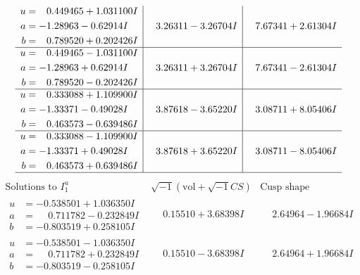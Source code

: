 \documentclass[1p]{elsarticle_modified}
\theoremstyle{definition}
\newcommand{\I}{\sqrt{-1}}
\begin{document}
$$\begin{array}{c|c|c}
\begin{aligned}
u &= \phantom{-}0.449465 + 1.031100 I \\
a &= -1.28963 - 0.62914 I \\
b &= \phantom{-}0.789520 + 0.202426 I\end{aligned}
 & \phantom{-}3.26311 - 3.26704 I & \phantom{-}7.67341 + 2.61304 I \\ \hline\begin{aligned}
u &= \phantom{-}0.449465 - 1.031100 I \\
a &= -1.28963 + 0.62914 I \\
b &= \phantom{-}0.789520 - 0.202426 I\end{aligned}
 & \phantom{-}3.26311 + 3.26704 I & \phantom{-}7.67341 - 2.61304 I \\ \hline\begin{aligned}
u &= \phantom{-}0.333088 + 1.109900 I \\
a &= -1.33371 - 0.49028 I \\
b &= \phantom{-}0.463573 - 0.639486 I\end{aligned}
 & \phantom{-}3.87618 - 3.65220 I & \phantom{-}3.08711 + 8.05406 I \\ \hline\begin{aligned}
u &= \phantom{-}0.333088 - 1.109900 I \\
a &= -1.33371 + 0.49028 I \\
b &= \phantom{-}0.463573 + 0.639486 I\end{aligned}
 & \phantom{-}3.87618 + 3.65220 I & \phantom{-}3.08711 - 8.05406 I\\
 \hline 
 \end{array}$$\newpage$$\begin{array}{c|c|c}  
\text{Solutions to }I^u_{1}& \I (\text{vol} + \sqrt{-1}CS) & \text{Cusp shape}\\
 \hline 
\begin{aligned}
u &= -0.538501 + 1.036350 I \\
a &= \phantom{-}0.711782 - 0.232849 I \\
b &= -0.803519 + 0.258105 I\end{aligned}
 & \phantom{-}0.15510 + 3.68398 I & \phantom{-}2.64964 - 1.96684 I \\ \hline\begin{aligned}
u &= -0.538501 - 1.036350 I \\
a &= \phantom{-}0.711782 + 0.232849 I \\
b &= -0.803519 - 0.258105 I\end{aligned}
 & \phantom{-}0.15510 - 3.68398 I & \phantom{-}2.64964 + 1.96684 I \\ \hline\begin{aligned}

\end{aligned}
\end{array}$$
\end{document}
